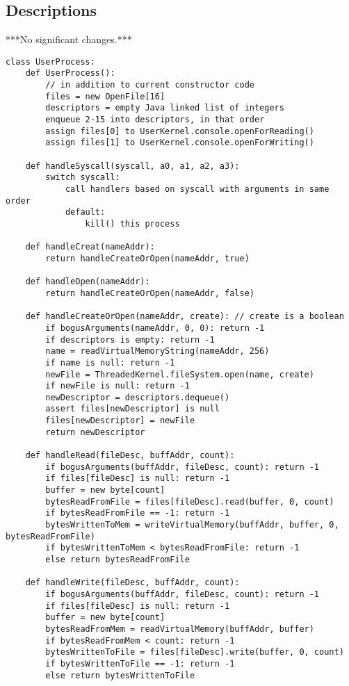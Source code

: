 \subsection{Descriptions}
\large
***No significant changes.***
\normalsize
\begin{verbatim}
class UserProcess:
    def UserProcess():
        // in addition to current constructor code
        files = new OpenFile[16]
        descriptors = empty Java linked list of integers
        enqueue 2-15 into descriptors, in that order
        assign files[0] to UserKernel.console.openForReading()
        assign files[1] to UserKernel.console.openForWriting()

    def handleSyscall(syscall, a0, a1, a2, a3):
        switch syscall:
            call handlers based on syscall with arguments in same order
            default:
                kill() this process

    def handleCreat(nameAddr):
        return handleCreateOrOpen(nameAddr, true)

    def handleOpen(nameAddr):
        return handleCreateOrOpen(nameAddr, false)

    def handleCreateOrOpen(nameAddr, create): // create is a boolean
        if bogusArguments(nameAddr, 0, 0): return -1
        if descriptors is empty: return -1
        name = readVirtualMemoryString(nameAddr, 256)
        if name is null: return -1
        newFile = ThreadedKernel.fileSystem.open(name, create)
        if newFile is null: return -1
        newDescriptor = descriptors.dequeue()
        assert files[newDescriptor] is null
        files[newDescriptor] = newFile
        return newDescriptor

    def handleRead(fileDesc, buffAddr, count):
        if bogusArguments(buffAddr, fileDesc, count): return -1
        if files[fileDesc] is null: return -1
        buffer = new byte[count]
        bytesReadFromFile = files[fileDesc].read(buffer, 0, count)
        if bytesReadFromFile == -1: return -1
        bytesWrittenToMem = writeVirtualMemory(buffAddr, buffer, 0, bytesReadFromFile)
        if bytesWrittenToMem < bytesReadFromFile: return -1
        else return bytesReadFromFile
    
    def handleWrite(fileDesc, buffAddr, count):
        if bogusArguments(buffAddr, fileDesc, count): return -1
        if files[fileDesc] is null: return -1
        buffer = new byte[count]
        bytesReadFromMem = readVirtualMemory(buffAddr, buffer)
        if bytesReadFromMem < count: return -1
        bytesWrittenToFile = files[fileDesc].write(buffer, 0, count)
        if bytesWrittenToFile == -1: return -1
        else return bytesWrittenToFile


\end{verbatim}

